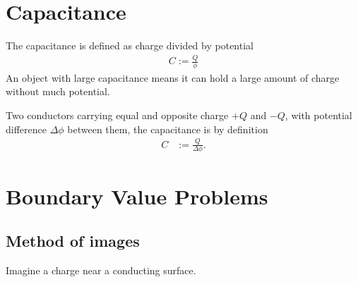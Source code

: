 \section{Capacitance}
The capacitance is defined as
charge divided by potential
\begin{align}
    C := \frac{Q}{\phi}
\end{align}
An object with large capacitance means it can hold a large amount of charge
without much potential.

Two conductors carrying equal and opposite charge
$+Q$ and $-Q$,
with potential difference $\Delta \phi$
between them,
the capacitance is by definition
\begin{align}
    C &:=
    \frac{Q}{\Delta \phi}.
\end{align}

\section{Boundary Value Problems}
\subsection{Method of images}
Imagine a charge near a conducting surface.

